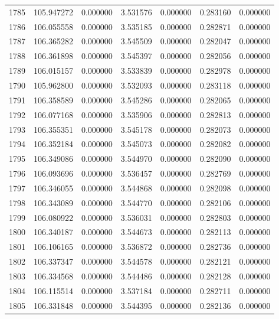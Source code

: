 \begin{tabular}{rrrrrrr}
1785 & 105.947272 &    0.000000 &  3.531576 &   0.000000 &   0.283160 &  0.000000 \\
1786 & 106.055558 &    0.000000 &  3.535185 &   0.000000 &   0.282871 &  0.000000 \\
1787 & 106.365282 &    0.000000 &  3.545509 &   0.000000 &   0.282047 &  0.000000 \\
1788 & 106.361898 &    0.000000 &  3.545397 &   0.000000 &   0.282056 &  0.000000 \\
1789 & 106.015157 &    0.000000 &  3.533839 &   0.000000 &   0.282978 &  0.000000 \\
1790 & 105.962800 &    0.000000 &  3.532093 &   0.000000 &   0.283118 &  0.000000 \\
1791 & 106.358589 &    0.000000 &  3.545286 &   0.000000 &   0.282065 &  0.000000 \\
1792 & 106.077168 &    0.000000 &  3.535906 &   0.000000 &   0.282813 &  0.000000 \\
1793 & 106.355351 &    0.000000 &  3.545178 &   0.000000 &   0.282073 &  0.000000 \\
1794 & 106.352184 &    0.000000 &  3.545073 &   0.000000 &   0.282082 &  0.000000 \\
1795 & 106.349086 &    0.000000 &  3.544970 &   0.000000 &   0.282090 &  0.000000 \\
1796 & 106.093696 &    0.000000 &  3.536457 &   0.000000 &   0.282769 &  0.000000 \\
1797 & 106.346055 &    0.000000 &  3.544868 &   0.000000 &   0.282098 &  0.000000 \\
1798 & 106.343089 &    0.000000 &  3.544770 &   0.000000 &   0.282106 &  0.000000 \\
1799 & 106.080922 &    0.000000 &  3.536031 &   0.000000 &   0.282803 &  0.000000 \\
1800 & 106.340187 &    0.000000 &  3.544673 &   0.000000 &   0.282113 &  0.000000 \\
1801 & 106.106165 &    0.000000 &  3.536872 &   0.000000 &   0.282736 &  0.000000 \\
1802 & 106.337347 &    0.000000 &  3.544578 &   0.000000 &   0.282121 &  0.000000 \\
1803 & 106.334568 &    0.000000 &  3.544486 &   0.000000 &   0.282128 &  0.000000 \\
1804 & 106.115514 &    0.000000 &  3.537184 &   0.000000 &   0.282711 &  0.000000 \\
1805 & 106.331848 &    0.000000 &  3.544395 &   0.000000 &   0.282136 &  0.000000 \\

\end{tabular}
